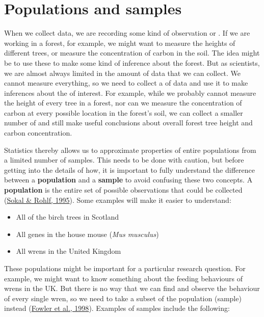 \documentclass[
  openany]{krantz}
\providecommand{\tightlist}{%
  \setlength{\itemsep}{0pt}\setlength{\parskip}{0pt}}
\begin{document}
\hypertarget{Chapter_4}{%
\chapter{Populations and samples}\label{Chapter_4}}

When we collect data, we are recording some kind of observation or .
If we are working in a forest, for example, we might want to measure the heights of different trees, or measure the concentration of carbon in the soil.
The idea might be to use these  to make some kind of inference about the forest.
But as scientists, we are almost always limited in the amount of data that we can collect.
We cannot measure everything, so we need to collect a \emph{} of data and use it to make inferences about the \emph{} of interest.
For example, while we probably cannot measure the height of every tree in a forest, nor can we measure the concentration of carbon at every possible location in the forest's soil, we can collect a smaller number of  and still make useful conclusions about overall forest tree height and carbon concentration.

Statistics thereby allows us to approximate properties of entire populations from a limited number of samples.
This needs to be done with caution, but before getting into the details of how, it is important to fully understand the difference between a \textbf{population} and a \textbf{sample} to avoid confusing these two concepts.
A \textbf{population} is the entire set of possible observations that could be collected (\protect\hyperlink{ref-Sokal1995}{Sokal \& Rohlf, 1995}).
Some examples will make it easier to understand:

\begin{itemize}
\tightlist
\item
  All of the birch trees in Scotland
\item
  All genes in the house mouse (\emph{Mus musculus})
\item
  All wrens in the United Kingdom
\end{itemize}

These populations might be important for a particular research question.
For example, we might want to know something about the feeding behaviours of wrens in the UK.
But there is no way that we can find and observe the behaviour of every single wren, so we need to take a subset of the population (sample) instead (\protect\hyperlink{ref-Fowler1998}{Fowler et al., 1998}).
Examples of samples include the following:
\end{document}
